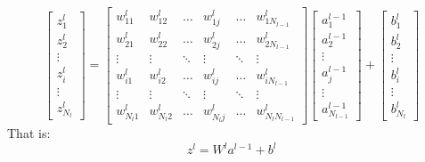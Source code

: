\documentclass{article}
\begin{document}
\[
\begin{bmatrix}
z^l_{1} \\ z^l_{2} \\ \vdots \\ z^l_{i} \\ \vdots  \\ z^l_{N_l}
\end{bmatrix}
=
\begin{bmatrix}
    w^l_{11} & w^l_{12} & \dots & w^l_{1j} & \dots  & w^l_{1N_{l-1}} \\
    w^l_{21} & w^l_{22} & \dots & w^l_{2j} & \dots  & w^l_{2N_{l-1}} \\
    \vdots & \vdots & \ddots & \vdots & \ddots & \vdots \\
    w^l_{i1} & w^l_{i2} & \dots & w^l_{ij} & \dots  & w^l_{iN_{l-1}} \\
    \vdots & \vdots & \ddots & \vdots & \ddots & \vdots \\
    w^l_{N_l1} & w^l_{N_l2} & \dots & w^l_{N_lj} & \dots & w^l_{N_lN_{l-1}}
\end{bmatrix}
\begin{bmatrix}
a^{l-1}_{1} \\ a^{l-1}_{2} \\ \vdots \\ a^{l-1}_{j} \\ \vdots  \\ a^{l-1}_{N_{l-1}}
\end{bmatrix}
+
\begin{bmatrix}
b^l_{1} \\ b^l_{2} \\ \vdots \\ b^l_{i} \\ \vdots  \\ b^l_{N_l}
\end{bmatrix}
\]
That is:
\[
z^l = W^l a^{l-1} + b^l
\]
\end{document}
